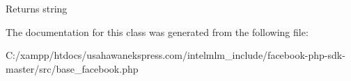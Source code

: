 \begin{DoxyReturn}{Returns}
string 
\end{DoxyReturn}


The documentation for this class was generated from the following file\-:\begin{DoxyCompactItemize}
\item 
C\-:/xampp/htdocs/usahawanekspress.\-com/intelmlm\-\_\-include/facebook-\/php-\/sdk-\/master/src/base\-\_\-facebook.\-php\end{DoxyCompactItemize}

